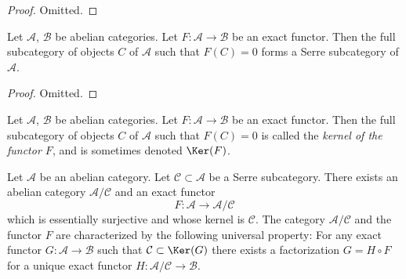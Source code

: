 \begin{proof}
Omitted.
\end{proof}

\begin{lemma}
\label{lemma-kernel-exact-functor}
Let $\mathcal{A}$, $\mathcal{B}$ be abelian categories.
Let $F : \mathcal{A} \to \mathcal{B}$ be an exact functor.
Then the full subcategory of objects $C$ of $\mathcal{A}$
such that $F(C) = 0$ forms a Serre subcategory of $\mathcal{A}$.
\end{lemma}

\begin{proof}
Omitted.
\end{proof}

\begin{definition}
\label{definition-kernel-category}
Let $\mathcal{A}$, $\mathcal{B}$ be abelian categories.
Let $F : \mathcal{A} \to \mathcal{B}$ be an exact functor.
Then the full subcategory of objects $C$ of $\mathcal{A}$
such that $F(C) = 0$ is called the {\it kernel of the functor $F$},
and is sometimes denoted $\Ker(F)$.
\end{definition}

\begin{lemma}
\label{lemma-serre-subcategory-is-kernel}
Let $\mathcal{A}$ be an abelian category.
Let $\mathcal{C} \subset \mathcal{A}$ be a Serre subcategory.
There exists an abelian category $\mathcal{A}/\mathcal{C}$
and an exact functor
$$
F : \mathcal{A} \longrightarrow \mathcal{A}/\mathcal{C}
$$
which is essentially surjective and whose kernel is $\mathcal{C}$.
The category $\mathcal{A}/\mathcal{C}$ and the functor $F$ are
characterized by the following universal property: For any exact
functor $G : \mathcal{A} \to \mathcal{B}$ such that
$\mathcal{C} \subset \Ker(G)$ there exists a factorization
$G = H \circ F$ for a unique exact functor
$H : \mathcal{A}/\mathcal{C} \to \mathcal{B}$.
\end{lemma}


